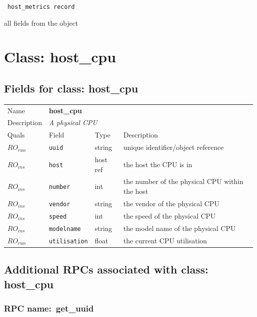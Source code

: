 \vspace{0.3cm}

{\tt 
host\_metrics record
}


all fields from the object
\vspace{0.3cm}
\vspace{0.3cm}
\vspace{0.3cm}

\vspace{1cm}
\newpage
\section{Class: host\_cpu}
\subsection{Fields for class: host\_cpu}
\begin{longtable}{|lllp{}|}
\hline
\multicolumn{1}{|l}{Name} & \multicolumn{3}{l|}{\bf host\_cpu} \\
\multicolumn{1}{|l}{Description} & \multicolumn{3}{l|}{\parbox{11cm}{\em A physical CPU}} \\
\hline
Quals & Field & Type & Description \\
\hline
$\mathit{RO}_\mathit{run}$ &  {\tt uuid} & string & unique identifier/object reference \\
$\mathit{RO}_\mathit{ins}$ &  {\tt host} & host ref & the host the CPU is in \\
$\mathit{RO}_\mathit{ins}$ &  {\tt number} & int & the number of the physical CPU within the host \\
$\mathit{RO}_\mathit{ins}$ &  {\tt vendor} & string & the vendor of the physical CPU \\
$\mathit{RO}_\mathit{ins}$ &  {\tt speed} & int & the speed of the physical CPU \\
$\mathit{RO}_\mathit{ins}$ &  {\tt modelname} & string & the model name of the physical CPU \\
$\mathit{RO}_\mathit{run}$ &  {\tt utilisation} & float & the current CPU utilisation \\
\hline
\end{longtable}
\subsection{Additional RPCs associated with class: host\_cpu}
\subsubsection{RPC name:~get\_uuid}

